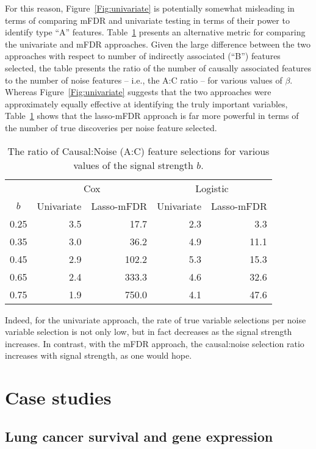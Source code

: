 For this reason, Figure~\ref{Fig:univariate} is potentially somewhat misleading in terms of comparing mFDR and univariate testing in terms of their power to identify type ``A'' features.
Table~\ref{Tab:univariate} presents an alternative metric for comparing the univariate and mFDR approaches.  Given the large difference between the two approaches with respect to number of indirectly associated (``B'') features selected, the table presents the ratio of the number of causally associated features to the number of noise features -- i.e., the A:C ratio -- for various values of $\beta$.  Whereas Figure~\ref{Fig:univariate} suggests that the two approaches were approximately equally effective at identifying the truly important variables, Table~\ref{Tab:univariate} shows that the lasso-mFDR approach is far more powerful in terms of the number of true discoveries per noise feature selected.

\begin{table}[ht!]
\centering
\caption{\label{Tab:univariate} The ratio of Causal:Noise (A:C) feature selections for various values of the signal strength $b$.}
\begin{tabular}{c | r r r r}
  \hline
  & \multicolumn{2}{c}{Cox} & \multicolumn{2}{c}{Logistic}\\
 $b$ & Univariate & Lasso-mFDR & Univariate & Lasso-mFDR \\ 
  \hline
  0.25 & 3.5 & 17.7 & 2.3 & 3.3 \\ 
  0.35 & 3.0 & 36.2 & 4.9 & 11.1 \\ 
  0.45 & 2.9 & 102.2 & 5.3 & 15.3 \\ 
  0.65 & 2.4 & 333.3 & 4.6 & 32.6 \\ 
  0.75 & 1.9 & 750.0 & 4.1 & 47.6 \\ 
   \hline
\end{tabular}
\end{table}

Indeed, for the univariate approach, the rate of true variable selections per noise variable selection is not only low, but in fact decreases as the signal strength increases. In contrast, with the mFDR approach, the causal:noise selection ratio increases with signal strength, as one would hope.

\section{Case studies}

\subsection{Lung cancer survival and gene expression}

